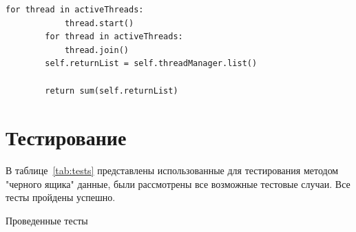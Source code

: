 \documentclass[12pt]{report}
\begin{document}
\begin{lstlisting}[caption=Параллельный алгоритм с делением на потоки\, класс Solver и функция calculateSumThreading,
        label={code:parallel}]
        for thread in activeThreads:
            thread.start()
        for thread in activeThreads:
            thread.join()
        self.returnList = self.threadManager.list()

        return sum(self.returnList)
    \end{lstlisting}


    \section{Тестирование}
    В таблице~\ref{tab:tests} представлены использованные для тестирования методом "черного ящика" данные,
    были рассмотрены все возможные тестовые случаи.
    Все тесты пройдены успешно.

    \begin{table}[H]
        \begin{center}
            \captionsetup{justification=raggedleft, singlelinecheck=false}
            \caption[]{\label{tab:tests} Проведенные тесты}


\end{center}
\end{table}
\end{document}
